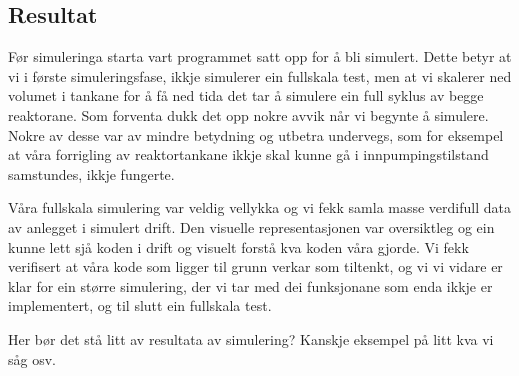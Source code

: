 \subsection{Resultat}


Før simuleringa starta vart programmet satt opp for å bli simulert. 
Dette betyr at vi i første simuleringsfase, ikkje simulerer ein fullskala test, men at vi skalerer ned volumet i tankane 
for å få ned tida det tar å simulere ein full syklus av begge reaktorane. 
Som forventa dukk det opp nokre avvik når vi begynte å simulere. 
Nokre av desse var av mindre betydning og utbetra  undervegs, som for eksempel at våra forrigling av reaktortankane ikkje skal 
kunne gå i innpumpingstilstand samstundes, ikkje fungerte.

Våra fullskala simulering var veldig vellykka og vi fekk samla masse verdifull data av anlegget i simulert drift. 
Den visuelle representasjonen var oversiktleg og ein kunne lett sjå koden i drift og visuelt forstå kva koden våra gjorde.  
Vi fekk verifisert at våra kode som ligger til grunn verkar som tiltenkt, og vi vi vidare er klar for ein større simulering, 
der vi tar med dei funksjonane som enda ikkje er implementert, og til slutt ein fullskala test.




Her bør det stå litt av resultata av simulering? \newline 
Kanskje eksempel på litt kva vi såg osv.\newline
